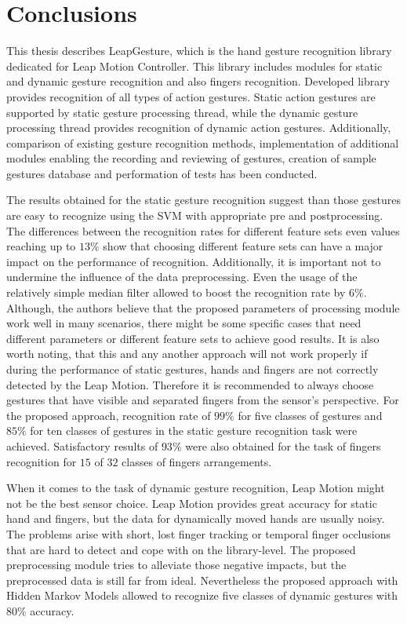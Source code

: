 \chapter{Conclusions}\label{conclusionsChapter}

This thesis describes LeapGesture, which is the hand gesture recognition library dedicated for Leap Motion Controller.
This library includes modules for static and dynamic gesture recognition and also fingers recognition.
Developed library provides recognition of all types of action gestures.
Static action gestures are supported by static gesture processing thread, while the dynamic gesture processing thread provides recognition of dynamic action gestures.
Additionally, comparison of existing gesture recognition methods, implementation of additional modules enabling the recording and reviewing of gestures, creation of sample gestures database and performation of tests has been conducted.

The results obtained for the static gesture recognition suggest than those gestures are easy to recognize using the SVM with appropriate pre and postprocessing.
The differences between the recognition rates for different feature sets even values reaching up to $13\%$ show that choosing different feature sets can have a major impact on the performance of recognition.
Additionally, it is important not to undermine the influence of the data preprocessing. 
Even the usage of the relatively simple median filter allowed to boost the recognition rate by $6\%$.
Although, the authors believe that the proposed parameters of processing module work well in many scenarios, there might be some specific cases that need different parameters or different feature sets to achieve good results.
It is also worth noting, that this and any another approach will not work properly if during the performance of static gestures, hands and fingers are not correctly detected by the Leap Motion.
Therefore it is recommended to always choose gestures that have visible and separated fingers from the sensor's perspective.
For the proposed approach, recognition rate of $99\%$ for five classes of gestures and $85\%$ for ten classes of gestures in the static gesture recognition task were achieved. Satisfactory results of $93\%$ were also obtained for the task of fingers recognition for $15$ of $32$ classes of fingers arrangements.

When it comes to the task of dynamic gesture recognition, Leap Motion might not be the best sensor choice.
Leap Motion provides great accuracy for static hand and fingers, but the data for dynamically moved hands are usually noisy.
The problems arise with short, lost finger tracking or temporal finger occlusions that are hard to detect and cope with on the library-level.
The proposed preprocessing module tries to alleviate those negative impacts, but the preprocessed data is still far from ideal.
Nevertheless the proposed approach with Hidden Markov Models allowed to recognize five classes of dynamic gestures with $80\%$ accuracy.

